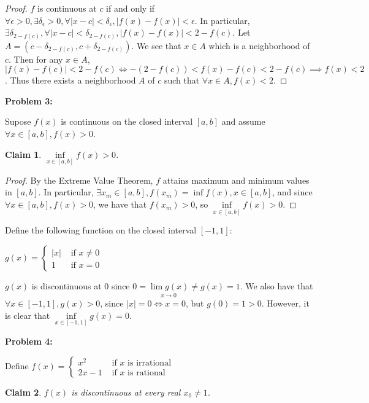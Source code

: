 \documentclass{article}
\newcommand{\eps}{\ensuremath{\epsilon}}
\newcommand{\pt}[1]{\textrm{ #1 }}
\newtheorem{clm}{Claim}
\begin{document}
\begin{proof}
	$f$ is continuous at $c$ if and only if
	$\forall \eps > 0, \exists \delta_\eps > 0,
	\forall |x - c| < \delta_\eps, |f(x) - f(x)| < \eps$.
	In particular,
	$\exists \delta_{2-f(c)}, \forall |x - c| < \delta_{2-f(c)}, |f(x) - f(x)| < 2 - f(c)$.
	Let $A = (c - \delta_{2 - f(c)}, c + \delta_{2 - f(c)})$.
	We see that $x \in A$ which is a neighborhood of $c$.
	Then for any $x \in A$, $|f(x) - f(c)| < 2 - f(c) \iff -(2 - f(c)) < f(x) - f(c) < 2 - f(c)
	\implies f(x) < 2$.
	Thus there exists a neighborhood $A$ of $c$ such that $\forall x \in A, f(x) < 2$.
\end{proof}

\textbf{Problem 3:}

Supose $f(x)$ is continuous on the closed interval $[a,b]$ and assume $\forall x \in [a,b], f(x) > 0$.

\begin{clm}
	$\underset{x \in [a,b]}{\inf} f(x) > 0$.
\end{clm}

\begin{proof}
	By the Extreme Value Theorem,
	$f$ attains maximum and minimum values in $[a,b]$.
	In particular, $\exists x_m \in [a,b], f(x_m) = \inf {f(x), x \in [a,b]}$,
	and since $\forall x \in [a,b], f(x) > 0$,
	we have that $f(x_m) > 0$,
	so $\underset{x \in [a,b]}{\inf} f(x) > 0$.
\end{proof}

Define the following function on the closed interval $[-1, 1]$:

$g(x) = \begin{cases} |x| & \pt{if $x \neq 0$} \\ 1 & \pt{if $x = 0$} \end{cases}$

$g(x)$ is discontinuous at $0$ since $0 = \underset{x \to 0}{\lim g(x)} \neq g(x) = 1$.
We also have that $\forall x \in [-1, 1], g(x) > 0$,
since $|x| = 0 \iff x = 0$, but $g(0) = 1 > 0$.
However, it is clear that $\underset{x \in [-1,1]}{\inf} g(x) = 0$.

\medskip

\textbf{Problem 4:}

Define $f(x) = \begin{cases} x^2 & \pt{if $x$ is irrational} \\ 2x-1 & \pt{if $x$ is rational} \end{cases}$

\begin{clm}
	$f(x)$ is discontinuous at every real $x_0 \neq 1$.
\end{clm}
\end{document}
